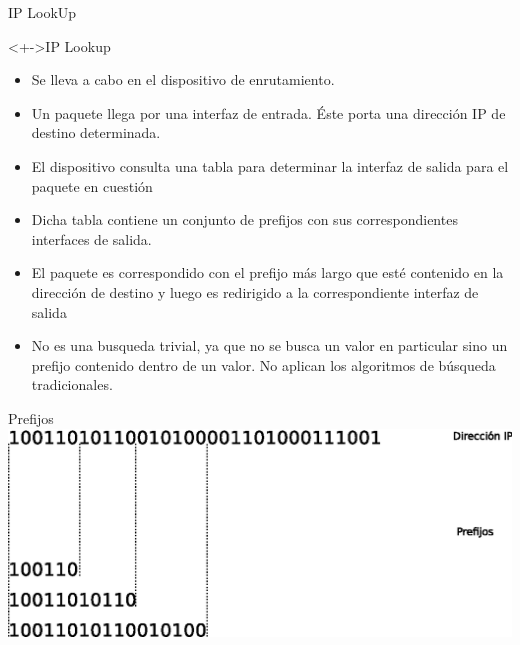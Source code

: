 \documentclass[xcolor=dvipsnames]{beamer}
\begin{document}
\begin{frame}{IP LookUp}
 \begin{block}<+->{IP Lookup}   
    \begin{itemize}
      \scriptsize
      \item Se lleva a cabo en el dispositivo de enrutamiento.
      \item Un paquete llega por una interfaz de entrada. Éste porta una dirección IP de destino determinada.
      \item El dispositivo consulta una tabla para determinar la interfaz de salida para el paquete en cuestión
      \item Dicha tabla contiene un conjunto de prefijos con sus correspondientes interfaces de salida.
      \item El paquete es correspondido con el prefijo más largo que esté contenido en la dirección de destino y luego es redirigido  a la correspondiente interfaz de salida
      \item No es una busqueda trivial, ya que no se busca un valor en particular sino un prefijo contenido dentro de un valor. No aplican los algoritmos de búsqueda tradicionales.   
    \end{itemize}
  \end{block}
\end{frame}

\begin{frame}{Prefijos}
\center 
\includegraphics[scale=0.75]{figures/prefijos.eps}
\end{frame}
\end{document}
